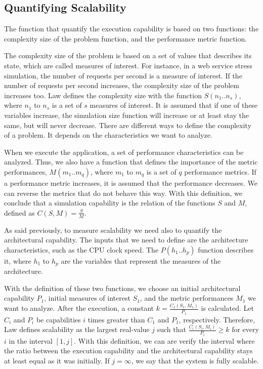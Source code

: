 \subsection{Quantifying Scalability}
\label{quantifyingScalability}

The function that quantify the execution capability is based on two functions: the complexity size of the problem function, and the performance metric function. 

The complexity size of the problem is based on a set of values that describes its state, which are called measures of interest. For instance, in a web service stress simulation, the number of requests per second is a measure of interest. If the number of requests per second increases, the complexity size of the problem increases too. Law defines the complexity size with the function $S(n_{1}..n_{s})$, where $n_{1}$ to $n_{s}$ is a set of $s$ measures of interest. It is assumed that if one of these variables increase, the simulation size function will increase or at least stay the same, but will never decrease. There are different ways to define the complexity of a problem. It depends on the characteristics we want to analyze.

When we execute the application, a set of performance characteristics can be analyzed. Thus, we also have a function that defines the importance of the metric performances, $M(m_{1}..m_{q})$, where $m_{1}$ to $m_{q}$ is a set of $q$ performance metrics. If a performance metric increases, it is assumed that the performance decreases. We can reverse the metrics that do not behave this way. With this definition, we conclude that a simulation capability is the relation of the functions $S$ and $M$, defined as $C(S,M) = \frac{S}{M}$.

As said previously, to measure scalability we need also to quantify the architectural capability. The inputs that we need to define are the architecture characteristics, such as the CPU clock speed. The $P(h_{1}..h_{p})$ function describes it, where $h_{1}$ to $h_{p}$ are the variables that represent the measures of the architecture.

With the definition of these two functions, we choose an initial architectural capability $P_{1}$, initial measures of interest $S_{1}$, and the metric performances $M_{1}$ we want to analyze. After the execution, a constant $k = \frac{C_{1}(S_{1},M_{1})}{P_{1}}$ is calculated. Let $C_{i}$ and $P_{i}$ be capabilities $i$ times greater than $C_{1}$ and $P_{1}$, respectively. Therefore, Law defines scalability as the largest real-value $j$ such that $\frac{C_{i}(S_{i},M_{i})}{P_{i}} \geq k$ for every $i$ in the interval $[1,j]$. With this definition, we can are verify the interval where the ratio between the execution capability and the architectural capability stays at least equal as it was initially. If $j = \infty$, we say that the system is fully scalable.

